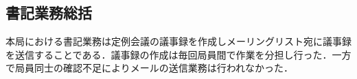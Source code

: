 \subsection*{書記業務総括}


本局における書記業務は定例会議の議事録を作成しメーリングリスト宛に議事録を送信することである．議事録の作成は毎回局員間で作業を分担し行った．一方で局員同士の確認不足によりメールの送信業務は行われなかった．
